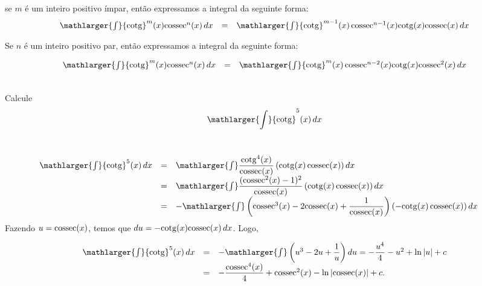 \cleardoublepage\documentclass[../main.tex]{subfiles}
\begin{document}
\subsubsection[\formula{Integrais do tipo   $\int {\rm cotg} ^m (x)\, {\rm cossec}^n(x)\,dx$}]{}
\begin{compactenum}[i.]
\item  se \(m\) é um inteiro positivo ímpar, então expressamos a integral da seguinte forma: 
\[ \begin{array}{lcl} \mathlarger{\int} {\rm cotg} ^m (x) {\rm cossec}^n(x)\,dx &=& \mathlarger{\int} {\rm cotg} ^{m-1}( x)\, {\rm cossec}^{n-1}(x) {\rm cotg} (x) {\rm cossec} (x)\,dx\\ \end{array} \]
\item Se \(n\) é um inteiro positivo par, então expressamos a integral da seguinte forma:

\[ \begin{array}{lcl}  \mathlarger{\int} {\rm cotg}^m (x) {\rm cossec}^n(x)\,dx &=& \mathlarger{\int} {\rm cotg}^m (x)\, {\rm cossec}^{n-2}(x) {\rm cotg}(x) {\rm cossec}^2(x)\,dx\end{array} \]
\end{compactenum}
\begin{ex}~
\\Calcule \[ \mathlarger{\int}{\rm cotg}^5( x)\,dx\]\\

\begin{solution}
\[ \begin{array}{lcl} \hspace*{-.5cm}\mathlarger{\int}{\rm cotg}^5( x)\,dx &=& \mathlarger{\int}\dfrac{{\rm cotg}^4 (x)}{{\rm cossec} (x)}\left({\rm cotg} (x)\, {\rm cossec} (x)\right)dx\\ &=& \mathlarger{\int}\dfrac{({\rm cossec}^2(x)-1)^2}{{\rm cossec}( x)}\left({\rm cotg} (x)\, {\rm cossec} (x)\right)dx\\ &=& -\mathlarger{\int}\left({\rm cossec}^3 (x) -2 {\rm cossec}( x) +\dfrac{1}{{\rm cossec}( x)} \right)\left(-{\rm cotg} (x)\, {\rm cossec} (x)\right)dx\\ \end{array} \]
Fazendo \(u={\rm cossec}(x) \), temos que \( du=-{\rm cotg}(x){\rm cossec}(x)\,dx \). Logo,

\[ \begin{array}{rcl} \mathlarger{\int}{\rm cotg}^5( x)\,dx &=& -\mathlarger{\int}\left(u^3 -2 u +\dfrac{1}{u} \right)du =-\dfrac{u^4}{4} -u^2 +\ln|u|+c\\ &=&-\dfrac{{\rm cossec}^4 (x)}{4} +{\rm cossec}^2(x) -\ln|{\rm cossec} (x)|+c. \end{array} \]
\end{solution}
\end{ex}
\end{document}
